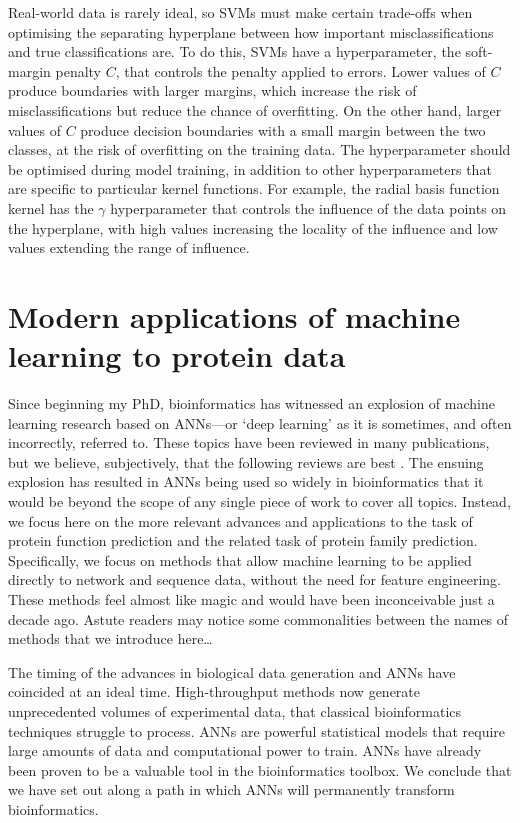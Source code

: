 Real-world data is rarely ideal, so SVMs must make certain trade-offs when optimising the separating hyperplane between how important misclassifications and true classifications are.
To do this, SVMs have a hyperparameter, the soft-margin penalty $C$, that controls the penalty applied to errors.
Lower values of $C$ produce boundaries with larger margins, which increase the risk of misclassifications but reduce the chance of overfitting.
On the other hand, larger values of $C$ produce decision boundaries with a small margin between the two classes, at the risk of overfitting on the training data.
The hyperparameter should be optimised during model training, in addition to other hyperparameters that are specific to particular kernel functions.
For example, the radial basis function kernel has the $\gamma$ hyperparameter that controls the influence of the data points on the hyperplane, with high values increasing the locality of the influence and low values extending the range of influence.

\section{Modern applications of machine learning to protein data}
\label{sec:intro-ml-application}

Since beginning my PhD, bioinformatics has witnessed an explosion of machine learning research based on ANNs---or `deep learning' as it is sometimes, and often incorrectly, referred to. These topics have been reviewed in many publications, but we believe, subjectively, that the following reviews are best \cite{Angermueller2016,Ching2017,Min2016,LeCun2015,Baldi2018,Schmidhuber2015,Goodfellow2016,Wainberg2018}. The ensuing explosion has resulted in ANNs being used so widely in bioinformatics that it would be beyond the scope of any single piece of work to cover all topics. Instead, we focus here on the more relevant advances and applications to the task of protein function prediction and the related task of protein family prediction. Specifically, we focus on methods that allow machine learning to be applied directly to network and sequence data, without the need for feature engineering. These methods feel almost like magic and would have been inconceivable just a decade ago. Astute readers may notice some commonalities between the names of methods that we introduce here\ldots{}

The timing of the advances in biological data generation and ANNs have coincided at an ideal time. High-throughput methods now generate unprecedented volumes of experimental data, that classical bioinformatics techniques struggle to process. ANNs are powerful statistical models that require large amounts of data and computational power to train. ANNs have already been proven to be a valuable tool in the bioinformatics toolbox. We conclude that we have set out along a path in which ANNs will permanently transform bioinformatics.

